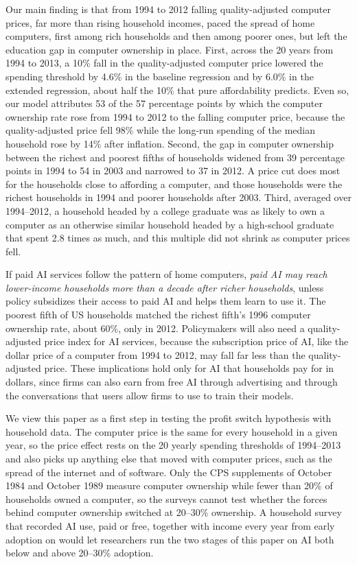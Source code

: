 \documentclass[11pt]{article}
\begin{document}
Our main finding is that from 1994 to 2012 falling quality-adjusted computer prices, far more than rising household incomes, paced the spread of home computers, first among rich households and then among poorer ones, but left the education gap in computer ownership in place. First, across the 20 years from 1994 to 2013, a 10\% fall in the quality-adjusted computer price lowered the spending threshold by 4.6\% in the baseline regression and by 6.0\% in the extended regression, about half the 10\% that pure affordability predicts. Even so, our model attributes 53 of the 57 percentage points by which the computer ownership rate rose from 1994 to 2012 to the falling computer price, because the quality-adjusted price fell 98\% while the long-run spending of the median household rose by 14\% after inflation. Second, the gap in computer ownership between the richest and poorest fifths of households widened from 39 percentage points in 1994 to 54 in 2003 and narrowed to 37 in 2012. A price cut does most for the households close to affording a computer, and those households were the richest households in 1994 and poorer households after 2003. Third, averaged over 1994--2012, a household headed by a college graduate was as likely to own a computer as an otherwise similar household headed by a high-school graduate that spent 2.8 times as much, and this multiple did not shrink as computer prices fell.

If paid AI services follow the pattern of home computers, \emph{paid AI may reach lower-income households more than a decade after richer households}, unless policy subsidizes their access to paid AI and helps them learn to use it. The poorest fifth of US households matched the richest fifth's 1996 computer ownership rate, about 60\%, only in 2012. Policymakers will also need a quality-adjusted price index for AI services, because the subscription price of AI, like the dollar price of a computer from 1994 to 2012, may fall far less than the quality-adjusted price. These implications hold only for AI that households pay for in dollars, since firms can also earn from free AI through advertising and through the conversations that users allow firms to use to train their models.

We view this paper as a first step in testing the profit switch hypothesis with household data. The computer price is the same for every household in a given year, so the price effect rests on the 20 yearly spending thresholds of 1994--2013 and also picks up anything else that moved with computer prices, such as the spread of the internet and of software. Only the CPS supplements of October 1984 and October 1989 measure computer ownership while fewer than 20\% of households owned a computer, so the surveys cannot test whether the forces behind computer ownership switched at 20--30\% ownership. A household survey that recorded AI use, paid or free, together with income every year from early adoption on would let researchers run the two stages of this paper on AI both below and above 20--30\% adoption.
\end{document}
